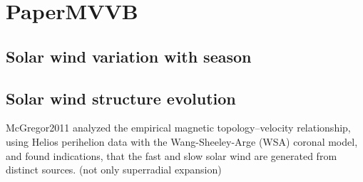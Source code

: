 \chapter{PaperMVVB}


\section{Solar wind variation with season}

\section{Solar wind structure evolution}

McGregor2011 analyzed the empirical magnetic topology–velocity relationship, using Helios perihelion data with the Wang-Sheeley-Arge (WSA) coronal model, and found indications, that the fast and slow solar wind are generated from distinct sources. (not only superradial expansion)\\

